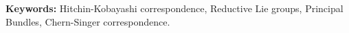 \documentclass[11 pt, a4paper, twoside]{report}
\theoremstyle{definition}
\begin{document}
    \noindent \textbf{Keywords:} Hitchin-Kobayashi correspondence, Reductive Lie groups, Principal Bundles, Chern-Singer correspondence.

\vspace*{\fill}

\(\hspace{1pt}\)
\newpage
\(\hspace{1pt}\)
\thispagestyle{empty}
\newpage


{\hypersetup{hidelinks}
\setlength{\parskip}{0pt}
\tableofcontents
}

\glsaddall

\newpage
 






\appendixpageoff
\begin{appendices}
    
    
    
\end{appendices}

\renewcommand*{\bibfont}{\small}
\printbibliography[heading=bibintoc, title = References] 
\end{document}
